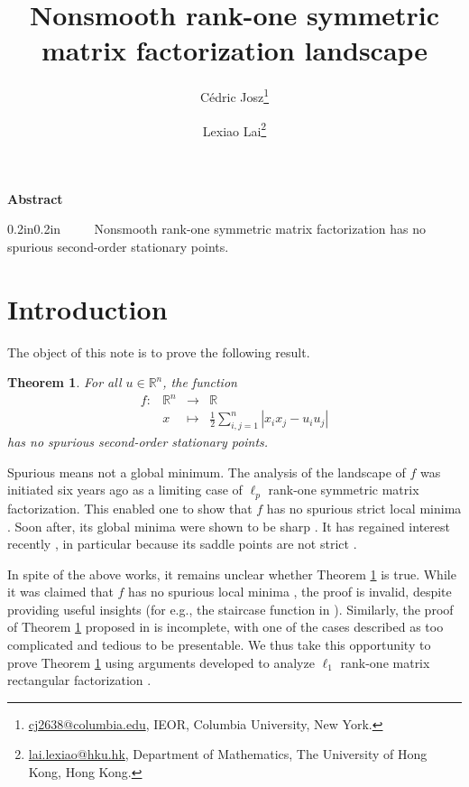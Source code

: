 \documentclass[12pt]{article}
\title{\LARGE Nonsmooth rank-one symmetric matrix factorization landscape}
\theoremstyle{definition}
\theoremstyle{plain}
\newtheorem{theorem}{Theorem}
\begin{document}
\author{\large C\'edric Josz\thanks{\url{cj2638@columbia.edu}, IEOR, Columbia University, New York.} \and Lexiao Lai\thanks{\url{lai.lexiao@hku.hk}, Department of Mathematics, The University of Hong Kong, Hong Kong.}}
\date{}

\maketitle
\vspace*{-5mm}%
\begin{center}
    \textbf{Abstract}
    \end{center}
    \vspace*{-4mm}
 \begin{adjustwidth}{0.2in}{0.2in}
~~~~ Nonsmooth rank-one symmetric matrix factorization has no spurious second-order stationary points.
\end{adjustwidth} 

\section{Introduction}
\label{intro}

The object of this note is to prove the following result.

\begin{theorem}
\label{thm:l1_rank1_symmetric_mf}
For all $u \in \mathbb{R}^n$, the function
\begin{equation*}
\label{eq:objective}
\begin{array}{rccc}
     f : & \mathbb{R}^n & \longrightarrow & \mathbb{R}  \\
         & x & \longmapsto & \frac{1}{2} \sum\limits_{i,j=1}^n |x_ix_j-u_iu_j|
\end{array} 
\end{equation*}
has no spurious second-order stationary points.
\end{theorem}

Spurious means not a global minimum. The analysis of the landscape of $f$ was initiated six years ago \cite{joszneurips2018} as a limiting case of $\ell_p$ rank-one symmetric matrix factorization. This enabled one to show that $f$ has no spurious strict local minima \cite[Proposition 3.1]{joszneurips2018}. Soon after, its global minima were shown to be sharp \cite[Theorem 8.6]{charisopoulos2021low}. It has regained interest recently \cite{guan2024ell_1}, in particular because its saddle points are not strict \cite{davis2022proximal}. 

In spite of the above works, it remains unclear whether Theorem \ref{thm:l1_rank1_symmetric_mf} is true. While it was claimed that $f$ has no spurious local minima \cite[Proposition 1.1]{joszneurips2018}, the proof is invalid, despite providing useful insights (for e.g., the staircase function in \cite[Lemma 3.1]{joszneurips2018}). Similarly, the proof of Theorem \ref{thm:l1_rank1_symmetric_mf} proposed in \cite[Corollary 3.11]{guan2024ell_1} is incomplete, with one of the cases described as too complicated and tedious to be presentable. We thus take this opportunity to prove Theorem \ref{thm:l1_rank1_symmetric_mf} using arguments developed to analyze $\ell_1$ rank-one matrix rectangular factorization \cite{josz2022nonsmooth}.
\end{document}
